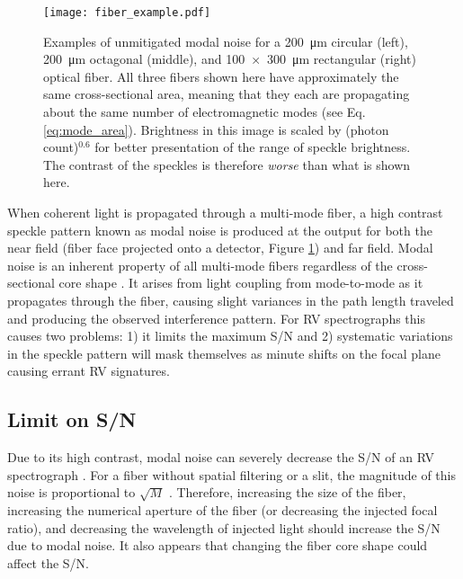 \documentclass[twocolumn]{emulateapj}
\begin{document}
\begin{figure}
\centering
	\texttt{[image: fiber\_example.pdf]}
	\caption{Examples of unmitigated modal noise for a \SI{200}{\micro\meter} circular (left), \SI{200}{\micro\meter} octagonal (middle), and \SI{100x300}{\micro\meter} rectangular (right) optical fiber. All three fibers shown here have approximately the same cross-sectional area, meaning that they each are propagating about the same number of electromagnetic modes (see Eq. \ref{eq:mode_area}). Brightness in this image is scaled by (photon count)$^{0.6}$ for better presentation of the range of speckle brightness. The contrast of the speckles is therefore \textit{worse} than what is shown here.}
\label{fig:fiber_example}
\end{figure}

When coherent light is propagated through a multi-mode fiber, a high contrast speckle pattern known as modal noise is produced at the output for both the near field (fiber face projected onto a detector, Figure \ref{fig:fiber_example}) and far field. Modal noise is an inherent property of all multi-mode fibers regardless of the cross-sectional core shape \citep{Sablowski2015}. It arises from light coupling from mode-to-mode as it propagates through the fiber, causing slight variances in the path length traveled and producing the observed interference pattern. For RV spectrographs this causes two problems: 1) it limits the maximum S/N and 2) systematic variations in the speckle pattern will mask themselves as minute shifts on the focal plane causing errant RV signatures.

\subsection{Limit on S/N}

Due to its high contrast, modal noise can severely decrease the S/N of an RV spectrograph \citep{Epworth1978, Baudrand2001, Lemke2011}. For a fiber without spatial filtering or a slit, the magnitude of this noise is proportional to $\sqrt{M}$ \citep{Goodman1981}. Therefore, increasing the size of the fiber, increasing the numerical aperture of the fiber (or decreasing the injected focal ratio), and decreasing the wavelength of injected light should increase the S/N due to modal noise. It also appears that changing the fiber core shape could affect the S/N.
\end{document}
